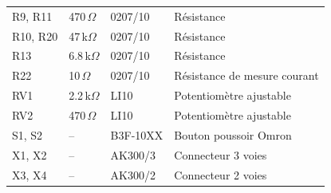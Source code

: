 \documentclass[a4paper,12pt,openany]{book}
\begin{document}
\begin{longtable}{|p{3.8cm}|p{3cm}|p{3.5cm}|p{5.5cm}|}
		R9, R11                      & 470\,$\Omega$   & 0207/10       & R\'esistance \\
		R10, R20                     & 47\,k$\Omega$   & 0207/10       & R\'esistance \\
		R13                           & 6.8\,k$\Omega$  & 0207/10       & R\'esistance \\
		R22                           & 10\,$\Omega$    & 0207/10       & R\'esistance de mesure courant \\
		\hline
		RV1                           & 2.2\,k$\Omega$  & LI10          & Potentiom\`etre ajustable \\
		RV2                           & 470\,$\Omega$   & LI10          & Potentiom\`etre ajustable \\
		\hline
		S1, S2                        & --              & B3F-10XX      & Bouton poussoir Omron \\
		\hline
		X1, X2                        & --              & AK300/3       & Connecteur 3 voies \\
		X3, X4                        & --              & AK300/2       & Connecteur 2 voies \\
		\hline
	\end{longtable}
	
\end{document}

